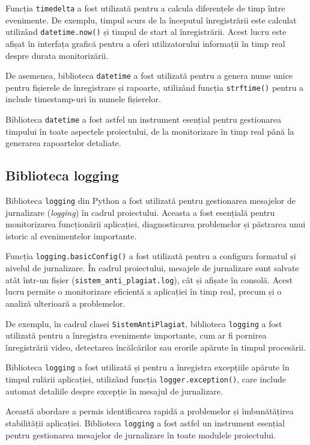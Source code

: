 \documentclass[12pt,a4paper]{article}
\begin{document}
Funcția \texttt{timedelta} a fost utilizată pentru a calcula diferențele de timp între evenimente. De exemplu, timpul scurs de la începutul înregistrării este calculat utilizând \texttt{datetime.now()} și timpul de start al înregistrării. Acest lucru este afișat în interfața grafică pentru a oferi utilizatorului informații în timp real despre durata monitorizării.

De asemenea, biblioteca \texttt{datetime} a fost utilizată pentru a genera nume unice pentru fișierele de înregistrare și rapoarte, utilizând funcția \texttt{strftime()} pentru a include timestamp-uri în numele fișierelor.

Biblioteca \texttt{datetime} a fost astfel un instrument esențial pentru gestionarea timpului în toate aspectele proiectului, de la monitorizare în timp real până la generarea rapoartelor detaliate.

\subsection{Biblioteca logging}
Biblioteca \texttt{logging}\cite{logging} din Python a fost utilizată pentru gestionarea mesajelor de jurnalizare (\textit{logging}) în cadrul proiectului. Aceasta a fost esențială pentru monitorizarea funcționării aplicației, diagnosticarea problemelor și păstrarea unui istoric al evenimentelor importante.

Funcția \texttt{logging.basicConfig()} a fost utilizată pentru a configura formatul și nivelul de jurnalizare. În cadrul proiectului, mesajele de jurnalizare sunt salvate atât într-un fișier (\texttt{sistem\_anti\_plagiat.log}), cât și afișate în consolă. Acest lucru permite o monitorizare eficientă a aplicației în timp real, precum și o analiză ulterioară a problemelor.

De exemplu, în cadrul clasei \texttt{SistemAntiPlagiat}, biblioteca \texttt{logging} a fost utilizată pentru a înregistra evenimente importante, cum ar fi pornirea înregistrării video, detectarea încălcărilor sau erorile apărute în timpul procesării.

Biblioteca \texttt{logging} a fost utilizată și pentru a înregistra excepțiile apărute în timpul rulării aplicației, utilizând funcția \texttt{logger.exception()}, care include automat detaliile despre excepție în mesajul de jurnalizare.

Această abordare a permis identificarea rapidă a problemelor și îmbunătățirea stabilității aplicației. Biblioteca \texttt{logging} a fost astfel un instrument esențial pentru gestionarea mesajelor de jurnalizare în toate modulele proiectului.
\end{document}
